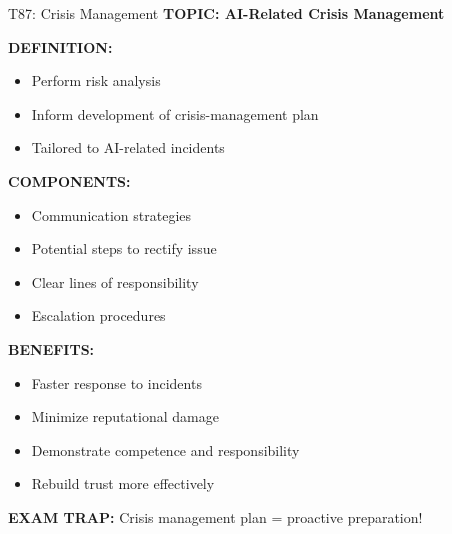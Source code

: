 \documentclass[8pt]{beamer}
\begin{document}
	\begin{frame}{T87: Crisis Management}
		\fontsize{6.5}{7.5}\selectfont
		\textbf{TOPIC: AI-Related Crisis Management}
		
		\vspace{0.1cm}
		\textbf{DEFINITION:}
		\begin{itemize}
			\item Perform risk analysis
			\item Inform development of crisis-management plan
			\item Tailored to AI-related incidents
		\end{itemize}
		
		\vspace{0.1cm}
		\textbf{COMPONENTS:}
		\begin{itemize}
			\item Communication strategies
			\item Potential steps to rectify issue
			\item Clear lines of responsibility
			\item Escalation procedures
		\end{itemize}
		
		\vspace{0.1cm}
		\textbf{BENEFITS:}
		\begin{itemize}
			\item Faster response to incidents
			\item Minimize reputational damage
			\item Demonstrate competence and responsibility
			\item Rebuild trust more effectively
		\end{itemize}
		
		\textcolor{myred}{\textbf{EXAM TRAP:}} Crisis management plan = \textcolor{myblue}{proactive preparation}!
	\end{frame}
	
\end{document}
